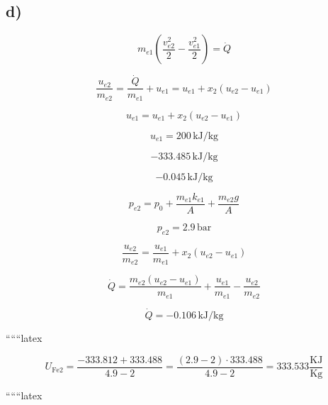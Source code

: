 

\subsection*{d)}

\[
m_{e1} \left( \frac{v_{e2}^2}{2} - \frac{v_{e1}^2}{2} \right) = \dot{Q}
\]

\[
\frac{u_{e2}}{m_{e2}} = \frac{\dot{Q}}{m_{e1}} + u_{e1} = u_{e1} + x_2 (u_{e2} - u_{e1})
\]

\[
u_{e1} = u_{e1} + x_2 (u_{e2} - u_{e1})
\]

\[
u_{e1} = 200 \, \text{kJ/kg}
\]

\[
-333.485 \, \text{kJ/kg}
\]

\[
-0.045 \, \text{kJ/kg}
\]

\[
p_{e2} = p_0 + \frac{m_{e1} k_{e1}}{A} + \frac{m_{e2} g}{A}
\]

\[
p_{e2} = 2.9 \, \text{bar}
\]

\[
\frac{u_{e2}}{m_{e2}} = \frac{u_{e1}}{m_{e1}} + x_2 (u_{e2} - u_{e1})
\]

\[
\dot{Q} = \frac{m_{e2} (u_{e2} - u_{e1})}{m_{e1}} + \frac{u_{e1}}{m_{e1}} - \frac{u_{e2}}{m_{e2}}
\]

\[
\dot{Q} = -0.106 \, \text{kJ/kg}
\]

``````latex

\[
U_{\text{Fe2}} = \frac{-333.812 + 333.488}{4.9 - 2} = \frac{(2.9 - 2) \cdot 333.488}{4.9 - 2} = 333.533 \frac{\text{KJ}}{\text{Kg}}
\]

``````latex